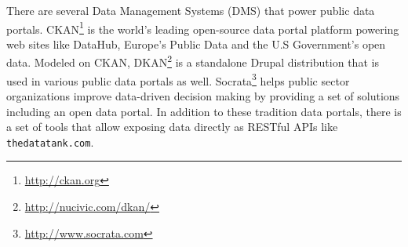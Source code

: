 \begin{figure}[ht!]
\end{figure}

There are several Data Management Systems (DMS) that power public data portals. CKAN\footnote{\url{http://ckan.org}} is the world's leading open-source data portal platform powering web sites like DataHub, Europe's Public Data and the U.S Government's open data. Modeled on CKAN, DKAN\footnote{\url{http://nucivic.com/dkan/}} is a standalone Drupal distribution that is used in various public data portals as well. Socrata\footnote{\url{http://www.socrata.com}} helps public sector organizations improve data-driven decision making by providing a set of solutions including an open data portal. In addition to these tradition data portals, there is a set of tools that allow exposing data directly as RESTful APIs like \texttt{thedatatank.com}.